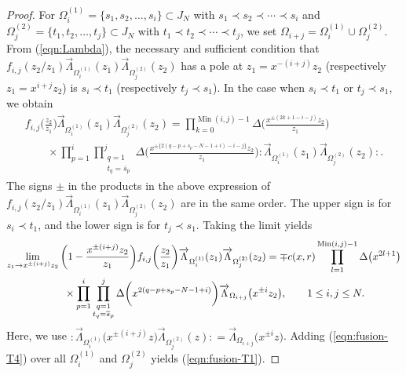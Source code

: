 \documentclass[10pt,a4paper]{amsart}
\numberwithin{equation}{section}
\begin{document}
\begin{proof}
For %
$\Omega_i^{(1)}=\{s_1, s_2, \dots, s_i\} \subset J_N$
with $s_1\prec s_2 \prec \cdots \prec s_i$ and
$\Omega_j^{(2)}=\{t_1, t_2, \dots, t_j\}\allowbreak \subset J_N$
with $t_1\prec t_2 \prec \cdots \prec t_j$,
we set $\Omega_{i+j}=\Omega_i^{(1)} \cup \Omega_j^{(2)}$.
From (\ref{eqn:Lambda}), the necessary and sufficient condition that
$f_{i,j}(z_2/z_1)\overrightarrow{\Lambda}_{\Omega_i^{(1)}}(z_1)
\overrightarrow{\Lambda}_{\Omega_j^{(2)}}(z_2)$
has a pole at $z_1=x^{-(i+j)}z_2$ (respectively $z_1=x^{i+j}z_2$)
is $s_i \prec t_1$ (respectively $t_j \prec s_1$).
In the case when $s_i \prec t_1$ or $t_j \prec s_1$, we obtain\vspace{-1ex}
\begin{gather*}
f_{i,j}\bigg(\frac{z_2}{z_1}\bigg)
\overrightarrow{\Lambda}_{\Omega_i^{(1)}}(z_1)
\overrightarrow{\Lambda}_{\Omega_j^{(2)}}(z_2)
=\prod_{k=0}^{\operatorname{Min}(i,j)-1}
\Delta\bigg(\frac{x^{{\pm(2k+1-i-j)}}z_2}{z_1}\bigg)
\\ \qquad
{}\times\prod_{p=1}^i\prod\limits_{\substack{q=1\\t_q=\overline{s}_p}}^j
\Delta\bigg(\frac{x^{{\pm \{2(q-p+s_p-N-1+i)-i-j\}}}z_2}{z_1}\bigg){:}
\overrightarrow{\Lambda}_{\Omega_i^{(1)}}(z_1)
\overrightarrow{\Lambda}_{\Omega_j^{(2)}}(z_2){:}.
\end{gather*}
The signs $\pm$
in the products in the above expression
of ${f_{i,j}(z_2/z_1)\overrightarrow{\Lambda}_{\Omega_i^{(1)}}(z_1)
\overrightarrow{\Lambda}_{\Omega_j^{(2)}}(z_2)}$ are in the same order.
The upper sign is for $s_i \prec t_1$, and the lower sign is for $t_j \prec s_1$.
Taking the limit yields
\begin{gather}
\lim_{z_1 \to x^{\pm (i+j)}z_2}
\bigg(1-\frac{x^{\pm (i+j)}z_2}{z_1}\bigg)f_{i,j}\bigg(\frac{z_2}{z_1}\bigg)
\overrightarrow{\Lambda}_{\Omega_i^{(1)}}(z_1)
\overrightarrow{\Lambda}_{\Omega_j^{(2)}}(z_2)\notag
=\mp c(x,r)\prod_{l=1}^{\operatorname{Min}(i,j)-1}\Delta\big(x^{2l+1}\big)
\\ \qquad
{}\times\prod_{p=1}^i\prod\limits_{\substack{q=1\\t_q=\overline{s}_p}}^j
\Delta\bigg(x^{2(q-p+s_p-N-1+i)}\bigg)
\overrightarrow{\Lambda}_{\Omega_{i+j}}\big(x^{\pm i}z_2\big),\qquad
1\leq i, j \leq N.
\label{eqn:fusion-T4}
\end{gather}
Here, we use ${:}\overrightarrow{\Lambda}_{\Omega_i^{(1)}}\big(x^{\pm (i+j)}z\big)
\overrightarrow{\Lambda}_{\Omega_j^{(2)}}(z){:}=
\overrightarrow{\Lambda}_{\Omega_{i+j}}\big(x^{\pm i}z\big)$.
Adding (\ref{eqn:fusion-T4}) over all $\Omega_i^{(1)}$ and
$\Omega_j^{(2)}$ yields (\ref{eqn:fusion-T1}).
\end{proof}
\end{document}

